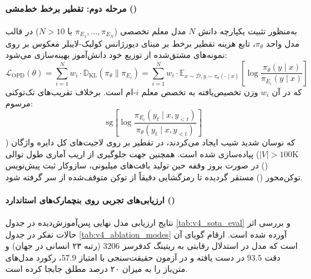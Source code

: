 \paragraph*{مرحله دوم: تقطیر برخط خط‌مشی ()}
به‌منظور تثبیت یکپارچه دانش $N$ مدل معلم تخصصی ($\pi_{E_1}, \dots, \pi_{E_N}$ با $N > 10$) در قالب مدل واحد $\pi_\theta$، تابع هزینه تقطیر برخط بر مبنای دیورژانس کولبک-لایبلر معکوس بر روی نمونه‌های مشتق‌شده از توزیع خود دانش‌آموز بهینه‌سازی می‌شود:
\begin{equation}
    \mathcal{L}_{\text{OPD}}(\theta) = \sum_{i=1}^{N} w_i \cdot \mathbb{D}_{\text{KL}}\left(\pi_\theta \parallel \pi_{E_i}\right) = \sum_{i=1}^{N} w_i \cdot \mathbb{E}_{x \sim \mathcal{D}, y \sim \pi_\theta(\cdot \mid x)} \left[ \log \frac{\pi_\theta(y \mid x)}{\pi_{E_i}(y \mid x)} \right]
\end{equation}
که در آن $w_i$ وزن تخصیص‌یافته به تخصص معلم $i$-ام است. برخلاف تقریب‌های تک‌توکنی مرسوم:
\begin{equation}
    \text{sg}\left[ \log \frac{\pi_{E_i}(y_t \mid x, y_{<t})}{\pi_\theta(y_t \mid x, y_{<t})} \right]
\end{equation}
که نوسان شدید شیب ایجاد می‌کردند، در  تقطیر بر روی لاجیت‌های کل دایره واژگان ($|V| > 100\text{K}$) پیاده‌سازی شده است. همچنین جهت جلوگیری از اریب آماری طول توالی () در صورت بروز وقفه حین تولید بافت‌های میلیونی، سازوکار ثبت پیش‌نویس توکن‌محور () مستقر گردیده تا رمزگشایی دقیقاً از توکن متوقف‌شده از سر گرفته شود.

\paragraph*{ارزیابی‌های تجربی روی بنچمارک‌های استاندارد ()}
نتایج ارزیابی مدل نهایی پس‌آموزش‌دیده  در جدول \ref{tab:v4_sota_eval} و بررسی اثر حالات تفکر در جدول \ref{tab:v4_ablation_modes} آورده شده است. ارقام گویای آن است که مدل در استدلال رقابتی به ریتینگ کدفرسز $3206$ (رتبه ۲۳ انسانی در جهان) و دقت $93.5$ در  دست یافته و در آزمون حقیقت‌سنجی  با امتیاز $57.9$، رکورد مدل‌های متن‌باز را به میزان ۲۰ درصد مطلق جابجا کرده است.

